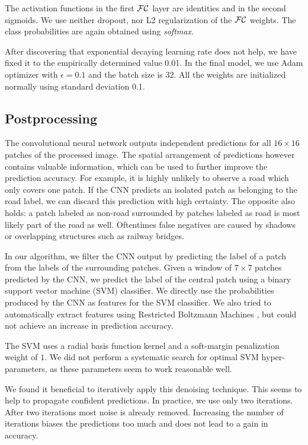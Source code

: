 \documentclass[10pt,conference,compsocconf]{IEEEtran}
\begin{document}
The activation functions in the first $ \cal{FC} $ layer are identities and in the second sigmoids. We use neither dropout, nor L2 regularization of the $ \cal{FC} $ weights. The class probabilities are again obtained using \textit{softmax}.

After discovering that exponential decaying learning rate does not help, we have fixed it to the empirically determined value 0.01. 
In the final model, we use Adam optimizer with $ \epsilon = 0.1 $ and the batch size is 32. All the weights are initialized normally using standard deviation 0.1.


\subsection{Postprocessing}
The convolutional neural network outputs independent predictions for all $ 16 \times 16 $ patches of the processed image. The spatial arrangement of predictions however contains valuable information, which can be used to further improve the prediction accuracy. For example, it is highly unlikely to observe a road which only covers one patch. If the CNN predicts an isolated patch as belonging to the road label, we can discard this prediction with high certainty. The opposite also holds: a patch labeled as non-road surrounded by patches labeled as road is most likely part of the road as well. Oftentimes false negatives are caused by shadows or overlapping structures such as railway bridges.

\par 
In our algorithm, we filter the CNN output by predicting the label of a patch from the labels of the surrounding patches. Given a window of $ 7 \times 7 $ patches predicted by the CNN, we predict the label of the central patch using a binary support vector machine (SVM) classifier. We directly use the probabilities produced by the CNN as features for the SVM classifier. We also tried to automatically extract features using Restricted Boltzmann Machines \cite{smolensky.1986}, but could not achieve an increase in prediction accuracy.
\par
The SVM uses a radial basis function kernel and a soft-margin penalization weight of $ 1 $. We did not perform a systematic search for optimal SVM hyper-parameters, as these parameters seem to work reasonable well.
\par 
We found it beneficial to iteratively apply this denoising technique. This seems to help to propagate confident predictions. In practice, we use only two iterations. After two iterations most noise is already removed. Increasing the number of iterations biases the predictions too much and does not lead to a gain in accuracy.
\end{document}
